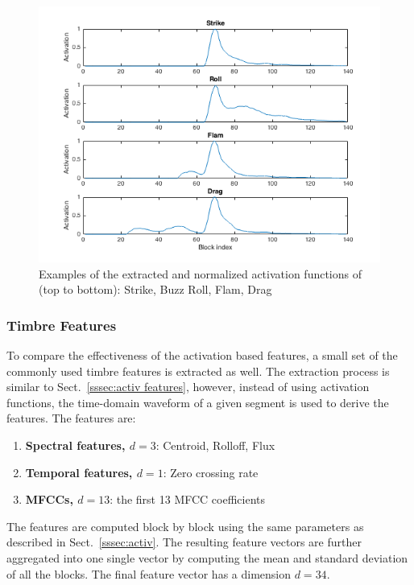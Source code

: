 \documentclass{article}
\begin{document}
\begin{figure}
\centering
\includegraphics[width = 8 cm]{./figures/activ_all.png}
\caption{Examples of the extracted and normalized activation functions of (top to bottom): Strike, Buzz Roll, Flam, Drag}
\label{fig:atvall}
\end{figure}

\subsubsection{Timbre Features}
\label{sssec:timbre features}
To compare the effectiveness of the activation based features, a small set of the commonly used timbre features is extracted as well. The extraction process is similar to Sect.~\ref{sssec:activ features}, however, instead of using activation functions, the time-domain waveform of a given segment is used to derive the features. The features are: 

\begin{enumerate}
	\item \textbf{Spectral features, $d = 3$}: Centroid, Rolloff, Flux
	\item \textbf{Temporal features, $d = 1$}: Zero crossing rate
	\item \textbf{MFCCs, $d = 13$}: the first 13 MFCC coefficients
\end{enumerate}

The features are computed block by block using the same parameters as described in Sect.~\ref{sssec:activ}. The resulting feature vectors are further aggregated into one single vector by computing the mean and standard deviation of all the blocks. The final feature vector has a dimension $d = 34$. 

%
\end{document}

